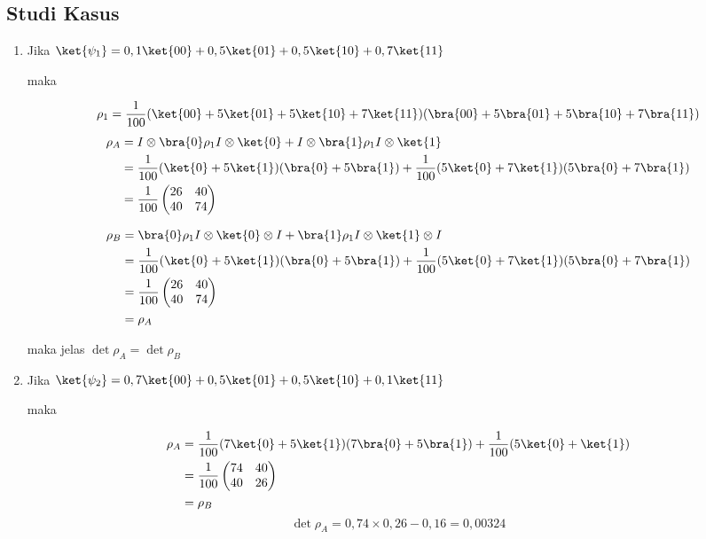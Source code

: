 \subsection{Studi Kasus}
\begin{enumerate}
	\item Jika $
	\ket{\psi_1}=0,1\ket{00}+0,5\ket{01}+0,5\ket{10}+0,7\ket{11}$
	
	maka
	
	\begin{equation}
		\rho_1=\frac{1}{100}(\ket{00}+5\ket{01}+5\ket{10}+7\ket{11})(\bra{00}+5\bra{01}+5\bra{10}+7\bra{11})
	\end{equation}
	\begin{equation}
		\begin{aligned}
			\rho_A
			&=I\otimes\bra{0}\rho_1I\otimes\ket{0} +I\otimes\bra{1}\rho_1I\otimes\ket{1}\\
			&=\frac{1}{100}(\ket{0}+5\ket{1})(\bra{0}+5\bra{1})+\frac{1}{100}(5\ket{0}+7\ket{1})(5\bra{0}+7\bra{1})\\
			&=\frac{1}{100}
			\begin{pmatrix}
				26&40\\
				40&74
			\end{pmatrix}
		\end{aligned}
	\end{equation}
	
	\begin{equation}
		\begin{aligned}
			\rho_B
			&=\bra{0}\rho_1I\otimes\ket{0}\otimes I +\bra{1}\rho_1I\otimes\ket{1}\otimes I\\
			&=\frac{1}{100}(\ket{0}+5\ket{1})(\bra{0}+5\bra{1})+\frac{1}{100}(5\ket{0}+7\ket{1})(5\bra{0}+7\bra{1})\\
			&=\frac{1}{100}
			\begin{pmatrix}
				26&40\\
				40&74
			\end{pmatrix}\\
			&=\rho_A
		\end{aligned}
	\end{equation}
	
	maka jelas $\det\rho_A=\det\rho_B$
	
	\item Jika $
	\ket{\psi_2}=0,7\ket{00}+0,5\ket{01}+0,5\ket{10}+0,1\ket{11}$
	
	maka
	
	\begin{equation}
		\begin{aligned}
			\rho_A
			&=\frac{1}{100}(7\ket{0}+5\ket{1})(7\bra{0}+5\bra{1})+\frac{1}{100}(5\ket{0}+\ket{1})\\
			&=\frac{1}{100}
			\begin{pmatrix}
				74&40\\
				40&26
			\end{pmatrix}\\
			&=\rho_B
		\end{aligned}
	\end{equation}
	\begin{equation}
		\det\rho_{A}=0,74\times0,26-0,16=0,00324
	\end{equation}
	

\end{enumerate}
